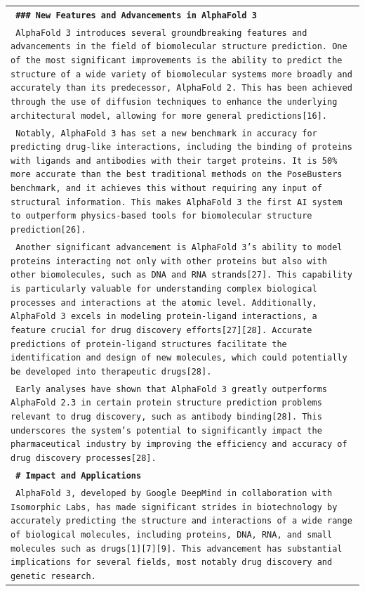\begin{longtable}{p{\textwidth}}
\vspace{1pt}
\texttt{\small{\textbf{ \#\#\# New Features and Advancements in AlphaFold 3 }}} \\
\texttt{\small{ AlphaFold 3 introduces several groundbreaking features and advancements in the field of biomolecular structure prediction. One of the most significant improvements is the ability to predict the structure of a wide variety of biomolecular systems more broadly and accurately than its predecessor, AlphaFold 2. This has been achieved through the use of diffusion techniques to enhance the underlying architectural model, allowing for more general predictions[16]. }} \\
\texttt{\small{ Notably, AlphaFold 3 has set a new benchmark in accuracy for predicting drug-like interactions, including the binding of proteins with ligands and antibodies with their target proteins. It is 50\% more accurate than the best traditional methods on the PoseBusters benchmark, and it achieves this without requiring any input of structural information. This makes AlphaFold 3 the first AI system to outperform physics-based tools for biomolecular structure prediction[26]. }} \\
\texttt{\small{ Another significant advancement is AlphaFold 3's ability to model proteins interacting not only with other proteins but also with other biomolecules, such as DNA and RNA strands[27]. This capability is particularly valuable for understanding complex biological processes and interactions at the atomic level. Additionally, AlphaFold 3 excels in modeling protein-ligand interactions, a feature crucial for drug discovery efforts[27][28]. Accurate predictions of protein-ligand structures facilitate the identification and design of new molecules, which could potentially be developed into therapeutic drugs[28]. }} \\
\texttt{\small{ Early analyses have shown that AlphaFold 3 greatly outperforms AlphaFold 2.3 in certain protein structure prediction problems relevant to drug discovery, such as antibody binding[28]. This underscores the system's potential to significantly impact the pharmaceutical industry by improving the efficiency and accuracy of drug discovery processes[28]. }} \\
\vspace{1pt}
\texttt{\small{\textbf{ \# Impact and Applications }}} \\
\texttt{\small{ AlphaFold 3, developed by Google DeepMind in collaboration with Isomorphic Labs, has made significant strides in biotechnology by accurately predicting the structure and interactions of a wide range of biological molecules, including proteins, DNA, RNA, and small molecules such as drugs[1][7][9]. This advancement has substantial implications for several fields, most notably drug discovery and genetic research. }} \\

\end{longtable}
